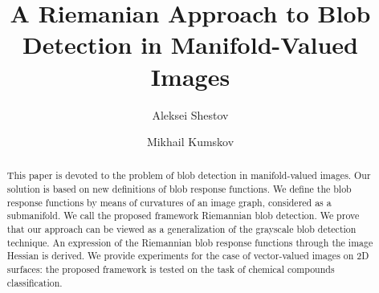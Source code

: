 \documentclass{llncs}
\begin{document}
\title{A Riemanian Approach to Blob Detection in Manifold-Valued Images}%

\author{Aleksei Shestov \and Mikhail Kumskov} 

\maketitle              %

\begin{abstract}
%
This paper is devoted to the problem of blob detection in manifold-valued images. Our solution is based on new definitions of blob response functions. We define the blob response functions by means of curvatures of an image graph, considered as a submanifold. We call the proposed framework Riemannian blob detection. We prove that our approach can be viewed as a generalization of the grayscale blob detection technique. An expression of the Riemannian blob response functions through the image Hessian is derived. We provide experiments for the case of vector-valued images on 2D surfaces: the proposed framework is tested on the task of chemical compounds classification.
 \end{abstract}  
%
\end{document}
